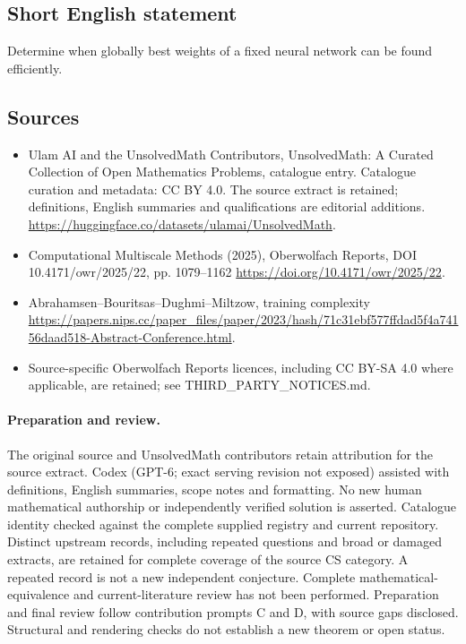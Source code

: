 \documentclass[11pt]{article}
\begin{document}
\subsection{Short English statement}
Determine when globally best weights of a fixed neural network can be found efficiently.
\subsection{Sources}
\begin{itemize}
\item[\hypertarget{source:statement:1}{S1}] Ulam AI and the UnsolvedMath Contributors, UnsolvedMath: A Curated Collection of Open Mathematics Problems, catalogue entry. Catalogue curation and metadata: CC BY 4.0. The source extract is retained; definitions, English summaries and qualifications are editorial additions.
\url{https://huggingface.co/datasets/ulamai/UnsolvedMath}.
\item[\hypertarget{source:statement:2}{S2}] Computational Multiscale Methods (2025), Oberwolfach Reports, DOI 10.4171/owr/2025/22, pp. 1079--1162
\url{https://doi.org/10.4171/owr/2025/22}.
\item[\hypertarget{source:statement:3}{S3}] Abrahamsen--Bouritsas--Dughmi--Miltzow, training complexity
\url{https://papers.nips.cc/paper_files/paper/2023/hash/71c31ebf577ffdad5f4a74156daad518-Abstract-Conference.html}.
\item Source-specific Oberwolfach Reports licences, including CC BY-SA 4.0 where applicable, are retained; see THIRD\_PARTY\_NOTICES.md.
\end{itemize}
\paragraph{Preparation and review.}
The original source and UnsolvedMath contributors retain attribution for the source extract. Codex (GPT-6; exact serving revision not exposed) assisted with definitions, English summaries, scope notes and formatting. No new human mathematical authorship or independently verified solution is asserted. Catalogue identity checked against the complete supplied registry and current repository. Distinct upstream records, including repeated questions and broad or damaged extracts, are retained for complete coverage of the source CS category. A repeated record is not a new independent conjecture. Complete mathematical-equivalence and current-literature review has not been performed. Preparation and final review follow contribution prompts C and D, with source gaps disclosed. Structural and rendering checks do not establish a new theorem or open status.
\label{end:statement}
\end{document}
